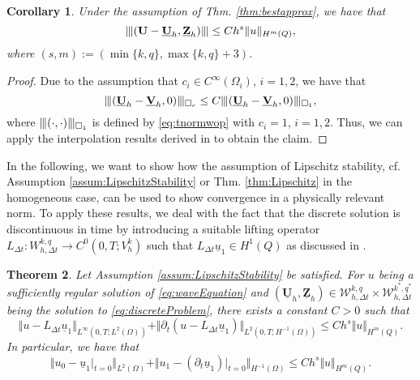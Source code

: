 \documentclass[sn-mathphys-num]{sn-jnl}
\newtheorem{thm}{Theorem}[section]
\newtheorem{cor}[thm]{Corollary}
\numberwithin{equation}{section}
\newcommand{\wop}{\square_c}
\newcommand{\tnorm}[1]{\vert\hspace{-0.3mm}\Vert#1\Vert\hspace{-0.3mm}\vert}
\newcommand{\FullyDiscrSpace}[2]{ W^{ {#1},{#2}}_{h, \Delta t  } }
\newcommand{\ProdFullyDiscrSpace}[2]{ \mathcal{W}^{ {#1},{#2}}_{h, \Delta t  } }
\newcommand{\Uh}{\underline{\mathbf{U}}_h}
\newcommand{\Vh}{\underline{\mathbf{V}}_h}
\newcommand{\Zh}{\underline{\mathbf{Z}}_h}
\newcommand{\ul}{\underline{u}}
\newcommand{\dt}{\partial_t}
\begin{document}
\begin{cor}\label{cor:tnormConvRates}
    Under the assumption of Thm. \ref{thm:bestapprox}, we have that
    \begin{equation*}
        \tnorm{(\mathbf{U} - \Uh,\Zh)} \le C h^s \Vert u \Vert_{H^m(Q)},
    \end{equation*}
    where $(s,m) := (\min\{ k,q \}, \max\{k,q\}+3)$. 
\end{cor}

\begin{proof}
    Due to the assumption that $c_i \in C^\infty(\Omega_i)$, $i = 1,2$, we have that 
    \begin{equation*}
        \tnorm{(\Uh - \Vh, 0)}_{\wop} \le C \tnorm{(\Uh - \Vh, 0)}_{\square_1},
    \end{equation*}
    where $\tnorm{(\cdot, \cdot)}_{\square_1}$ is defined by \eqref{eq:tnormwop} with $c_i = 1$, $i = 1,2$. Thus, we can apply the interpolation results derived in \cite[Lem. 2.4]{BP24} to obtain the claim. 
\end{proof}


\noindent In the following, we want to show how the assumption of Lipschitz stability, cf. Assumption \ref{assum:LipschitzStability} or Thm. \ref{thm:Lipschitz} in the homogeneous case, can be used to show convergence in a physically relevant norm. To apply these results, we deal with the fact that the discrete solution is discontinuous in time by introducing a suitable lifting operator $L_{\Delta t} : \FullyDiscrSpace{k}{q} \rightarrow C^0(0,T;V_h^k)$ such that $L_{\Delta t} \ul_1 \in H^1(Q)$ as discussed in \cite[Sec. 4]{BP24}. 



\begin{thm}
    Let Assumption \ref{assum:LipschitzStability} be satisfied. For $u$ being a sufficiently regular solution of \eqref{eq:waveEquation} and $(\Uh,\Zh) \in \ProdFullyDiscrSpace{k}{q} \times \ProdFullyDiscrSpace{k^\ast}{q^\ast}$ being the solution to \eqref{eq:discreteProblem}, there exists a constant $C>0$ such that
    \begin{equation}
        \Vert u - L_{\Delta t} \ul_1 \Vert_{L^\infty(0,T;L^2(\Omega))} + \Vert \dt (u - L_{\Delta t} \ul_1) \Vert_{L^2(0,T;H^{-1}(\Omega))} \le C h^s \Vert u \Vert_{H^m(Q)}. 
    \end{equation}
    In particular, we have that 
    \begin{equation}
        \Vert u_0 - \ul_1 \vert_{t = 0} \Vert_{L^2(\Omega)} + \Vert u_1 - (\dt \ul_1) \vert_{t = 0} \Vert_{H^{-1}(\Omega)} \le C h^s \Vert u \Vert_{H^m(Q)}.
    \end{equation}
\end{thm}
\end{document}
